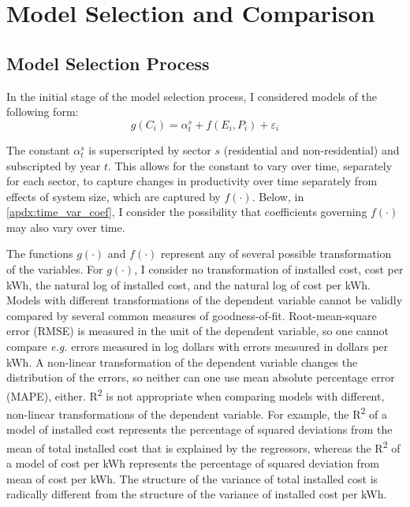 \section{Model Selection and Comparison}\label{apdx:methodology}
\subsection{Model Selection Process}\label{apdx:model_selection}

In the initial stage of the model selection process, I considered models of the following form:
\begin{equation}\label{eq:generalized_equation}
    g(C_i) = \alpha^{s}_{t} + f(E_i, P_i) + \varepsilon_i
\end{equation}

The constant $\alpha^{s}_{t}$ is superscripted by sector $s$ (residential and non-residential) and subscripted by year $t$. This allows for the constant to vary over time, separately for each sector, to capture changes in productivity over time separately from effects of system size, which are captured by $f(\cdot)$. Below, in \ref{apdx:time_var_coef}, I consider the possibility that coefficients governing $f(\cdot)$ may also vary over time.

The functions $g(\cdot)$ and $f(\cdot)$ represent any of several possible transformation of the variables. For $g(\cdot)$, I consider no transformation of installed cost, cost per kWh, the natural log of installed cost, and the natural log of cost per kWh. Models with different transformations of the dependent variable cannot be validly compared by several common measures of goodness-of-fit. Root-mean-square error (RMSE) is measured in the unit of the dependent variable, so one cannot compare \textit{e.g.} errors measured in log dollars with errors measured in dollars per kWh. A non-linear transformation of the dependent variable changes the distribution of the errors, so neither can one use mean absolute percentage error (MAPE), either. R\textsuperscript{2} is not appropriate when comparing models with different, non-linear transformations of the dependent variable. For example, the R\textsuperscript{2} of a model of installed cost represents the percentage of squared deviations from the mean of total installed cost that is explained by the regressors, whereas the R\textsuperscript{2} of a model of cost per kWh represents the percentage of squared deviation from mean of cost per kWh. The structure of the variance of total installed cost is radically different from the structure of the variance of installed cost per kWh.

